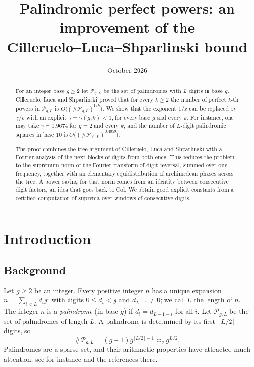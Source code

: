 \documentclass[11pt]{amsart}
\title[Palindromic perfect powers]{Palindromic perfect powers: an improvement of the\\ Cilleruelo--Luca--Shparlinski bound}
\date{October 2026}
\theoremstyle{definition}
\numberwithin{equation}{section}
\newcommand{\cP}{\mathcal{P}}
\begin{document}
\begin{abstract}
For an integer base $g\ge2$ let $\cP_{g,L}$ be the set of palindromes with
$L$ digits in base $g$. Cilleruelo, Luca and Shparlinski proved that for
every $k\ge2$ the number of perfect $k$-th powers in $\cP_{g,L}$ is
$O\bigl((\#\cP_{g,L})^{1/k}\bigr)$. We show that the exponent $1/k$ can be
replaced by $\gamma/k$ with an explicit $\gamma=\gamma(g,k)<1$, for every
base $g$ and every $k$. For instance, one may take $\gamma=0.9674$ for
$g=2$ and every $k$, and the number of $L$-digit palindromic squares in
base $10$ is $O\bigl((\#\cP_{10,L})^{0.4959}\bigr)$.

The proof combines the tree argument of Cilleruelo, Luca and Shparlinski
with a Fourier analysis of the next blocks of digits from both ends. This
reduces the problem to the supremum norm of the Fourier transform of digit
reversal, summed over one frequency, together with an elementary
equidistribution of archimedean phases across the tree. A power saving for
that norm comes from an identity between consecutive digit factors, an idea
that goes back to Col. We obtain good explicit constants from a certified
computation of suprema over windows of consecutive digits.
\end{abstract}

\maketitle

\section{Introduction}

\subsection{Background}
Let $g\ge2$ be an integer. Every positive integer $n$ has a unique expansion
$n=\sum_{i<L}d_ig^i$ with digits $0\le d_i<g$ and $d_{L-1}\ne0$; we call $L$
the length of $n$. The integer $n$ is a \emph{palindrome} (in base $g$) if
$d_i=d_{L-1-i}$ for all $i$. Let $\cP_{g,L}$ be the set of palindromes of
length $L$. A palindrome is determined by its first $\lceil L/2\rceil$
digits, so
\[
\#\cP_{g,L}=(g-1)g^{\lceil L/2\rceil-1}\asymp_g g^{L/2}.
\]
Palindromes are a sparse set, and their arithmetic properties have
attracted much attention; see for instance
\cite{BHS,Col,CLB,TP,DMRSS} and the references there.
\end{document}
